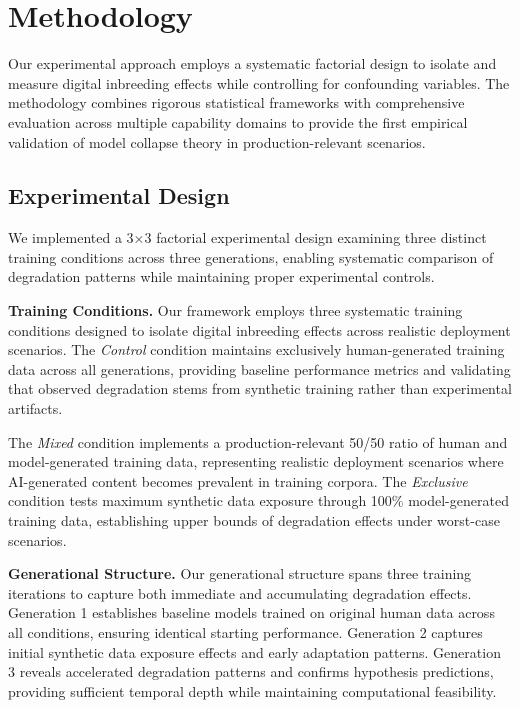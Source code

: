 \documentclass{article}
\begin{document}
\section{Methodology}

Our experimental approach employs a systematic factorial design to isolate and measure digital inbreeding effects while controlling for confounding variables. The methodology combines rigorous statistical frameworks with comprehensive evaluation across multiple capability domains to provide the first empirical validation of model collapse theory in production-relevant scenarios.

\subsection{Experimental Design}

We implemented a 3×3 factorial experimental design examining three distinct training conditions across three generations, enabling systematic comparison of degradation patterns while maintaining proper experimental controls.

\textbf{Training Conditions.} Our framework employs three systematic training conditions designed to isolate digital inbreeding effects across realistic deployment scenarios. The \textit{Control} condition maintains exclusively human-generated training data across all generations, providing baseline performance metrics and validating that observed degradation stems from synthetic training rather than experimental artifacts. 

The \textit{Mixed} condition implements a production-relevant 50/50 ratio of human and model-generated training data, representing realistic deployment scenarios where AI-generated content becomes prevalent in training corpora. The \textit{Exclusive} condition tests maximum synthetic data exposure through 100\% model-generated training data, establishing upper bounds of degradation effects under worst-case scenarios.

\textbf{Generational Structure.} Our generational structure spans three training iterations to capture both immediate and accumulating degradation effects. Generation 1 establishes baseline models trained on original human data across all conditions, ensuring identical starting performance. Generation 2 captures initial synthetic data exposure effects and early adaptation patterns. Generation 3 reveals accelerated degradation patterns and confirms hypothesis predictions, providing sufficient temporal depth while maintaining computational feasibility.
\end{document}
